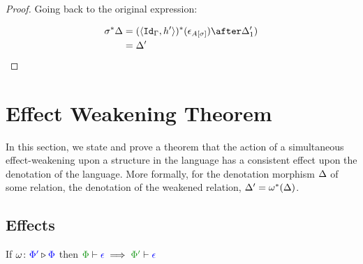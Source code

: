 \documentclass{report}
\begin{document}
\begin{framed}
\begin{proof}
    Going back to the original expression:
    
    \begin{align*}
        \si\star{\D} & = (\pr{\Id{\G}}{h'})\star(\e_{A\ssi})\after\D_1')\\
        & = \D'\\
    \end{align*}
    
    \end{proof}
    
\end{framed}

\chapter{Effect Weakening Theorem}
In this section, we state and prove a theorem that the action of a simultaneous effect-weakening upon a structure in the language has a consistent effect upon the denotation of the language. More formally, for the denotation morphism $\Delta$ of some relation, the denotation of the weakened relation, $\Delta' = \omega^*(\Delta)$.
   
\section{Effects}

\begin{theorem}
    If $\omega \colon {\color{blue}\Phi'} \triangleright {\color {blue} \Phi}$ then $\wellformed{\P}{\e}\implies\wellformed{\P'}{\e}$ 
\end{theorem}
\end{document}
